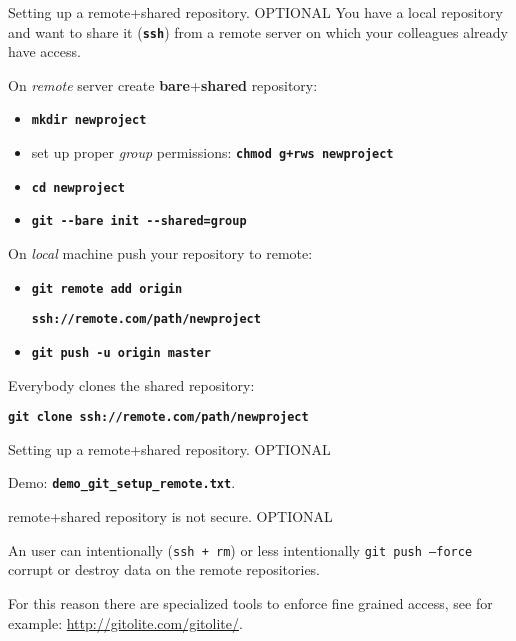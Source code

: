 \documentclass{beamer}
\begin{document}
\begin{frame}{Setting up a remote+shared repository. \alert{OPTIONAL}}
  You have a local repository and want to share it
  (\texttt{\textbf{ssh}}) from a remote server on which your
  colleagues already have access.
  \begin{block}{On \emph{remote} server create
      \textbf{bare}+\textbf{shared} repository:}
    \begin{itemize}
    \item \texttt{\textbf{mkdir newproject}}
    \item set up proper \emph{group} permissions: \texttt{\textbf{chmod g+rws newproject}}
    \item \texttt{\textbf{cd newproject}}
    \item \texttt{\textbf{git \alert{-{}-bare} init \alert{-{}-shared=group}}}
    \end{itemize}
  \end{block}
  \begin{block}{On \emph{local} machine push your repository to remote:}
    \begin{itemize}
    \item \texttt{\textbf{git remote add origin }}
          \begin{center}
            \texttt{\textbf{ssh://remote.com/path/newproject}}
      \end{center}
    \item \texttt{\textbf{git push \alert{-u} origin master}}
    \end{itemize}
  \end{block}
  Everybody clones the shared repository:
  \begin{center}
    \texttt{\textbf{git clone ssh://remote.com/path/newproject}}
  \end{center}
\end{frame}


\begin{frame}{Setting up a remote+shared repository. \alert{OPTIONAL}}
  \begin{center}
    Demo: \texttt{\textbf{demo\_git\_setup\_remote.txt}}.
  \end{center}
\end{frame}

\begin{frame}{remote+shared repository is not secure. \alert{OPTIONAL}}
  \begin{center}
    An user can intentionally (\texttt{ssh + rm}) or less
    intentionally \texttt{git push --force} corrupt or destroy data on
    the remote repositories.

    For this reason there are specialized tools to enforce fine
    grained access, see for example:
    \url{http://gitolite.com/gitolite/}.
  \end{center}
\end{frame}
\end{document}
